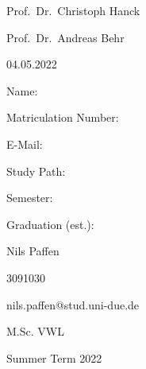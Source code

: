 \documentclass[12pt,a4paper]{article}
\begin{document}
\begin{titlepage}
  \noindent\begin{minipage}[t]{0.3\textwidth}
  \end{minipage}
  \begin{minipage}[t]{0.7\textwidth}
  \hspace{1cm}Prof.~Dr.~Christoph Hanck
  \end{minipage}
  
  \noindent\begin{minipage}[t]{0.3\textwidth}
  \end{minipage}
  \begin{minipage}[t]{0.7\textwidth}
  \hspace{1cm}Prof.~Dr.~Andreas Behr
  \end{minipage}

  \noindent\begin{minipage}[t]{0.3\textwidth}
  \end{minipage}
  \begin{minipage}[t]{0.7\textwidth}
  \hspace{1cm}04.05.2022
  \end{minipage}

  \hrulefill

  \begin{multicols}{3}

  Name:

  Matriculation Number:

  E-Mail:

  Study Path:

  Semester:

  Graduation (est.):
 
 
  
  \columnbreak

  Nils Paffen

  3091030
  
  \begin{scriptsize} 
  nils.paffen@stud.uni-due.de 
  \end{scriptsize}

   M.Sc. VWL


  Summer Term 2022

	\end{multicols}

\end{titlepage}
\end{document}
